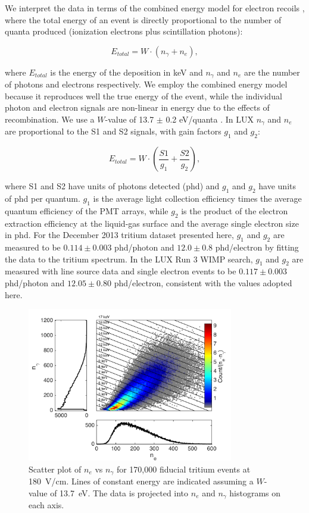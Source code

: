 We interpret the data in terms of the combined energy model for electron recoils \cite{Platzman}, where the total energy of an event is directly proportional to the number of quanta produced (ionization electrons plus scintillation photons):

\begin{equation}
E_{total} = W \cdot (n_{\gamma} + n_e ),
\label{platzman_eq}
\end{equation}

\noindent
where $E_{total}$ is the energy of the deposition in keV and  $n_\gamma$ and $n_e$ are the number of photons and electrons respectively. We employ the combined energy model because it reproduces well the true energy of the event, while the individual photon and electron signals are non-linear in energy due to the effects of recombination. We use a $W$-value of 13.7 $\pm$ 0.2 eV/quanta \cite{Dahl_Thesis}. In LUX $n_{\gamma}$ and $n_e$ are proportional to the S1 and S2 signals, with gain factors $g_1$ and $g_2$: 

\begin{equation}
E_{total} = W \cdot \left(\frac{S1}{g_1} + \frac{S2}{g_2} \right),
\label{energy_eq}
\end{equation}

\noindent
where S1 and S2 have units of photons detected (phd) and $g_1$ and $g_2$ have units of phd per quantum. $g_1$ is the average light collection efficiency times the average quantum efficiency of the PMT arrays, while $g_2$ is the product of the electron extraction efficiency at the liquid-gas surface and the average single electron size in phd. For the December 2013 tritium dataset presented here, $g_1$ and $g_2$ are measured to be $0.114 \pm 0.003$ phd/photon and $12.0 \pm 0.8$ phd/electron by fitting the data to the tritium spectrum.  In the LUX Run 3 WIMP search, $g_1$ and $g_2$ are measured with line source data and single electron events to be $0.117 \pm 0.003$ phd/photon and $12.05 \pm 0.80$ phd/electron\cite{lux-reanalysis, lux-prd}, consistent with the values adopted here.

\begin{figure}[h!]
\includegraphics[width=90mm]{fig/tritium_scatter.png}
\caption{Scatter plot of $n_e$ vs $n_{\gamma}$ for 170,000 fiducial tritium events at 180~V/cm. Lines of constant energy are indicated assuming a $W$-value of 13.7~eV. The data is projected into $n_e$ and $n_{\gamma}$ histograms on each axis.}
\label{fig:tritium-scatter}
\end{figure}


